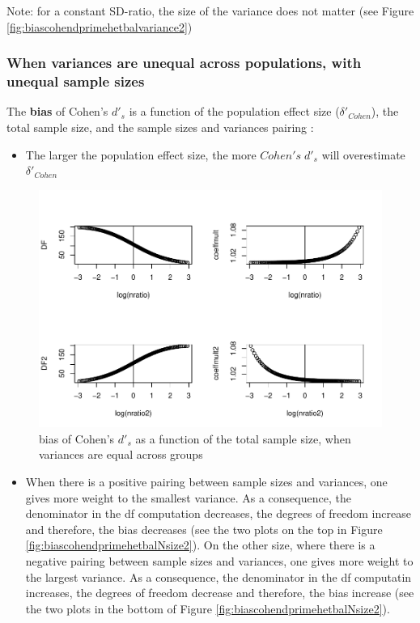 \documentclass[
  man]{apa6}
\providecommand{\tightlist}{%
  \setlength{\itemsep}{0pt}\setlength{\parskip}{0pt}}
\begin{document}
Note: for a constant SD-ratio, the size of the variance does not matter (see Figure \ref{fig:biascohendprimehetbalvariance2})

\hypertarget{when-variances-are-unequal-across-populations-with-unequal-sample-sizes}{%
\subsubsection{When variances are unequal across populations, with unequal sample sizes}\label{when-variances-are-unequal-across-populations-with-unequal-sample-sizes}}

The \textbf{bias} of Cohen's \(d'_s\) is a function of the population effect size (\(\delta'_{Cohen}\)), the total sample size, and the sample sizes and variances pairing :

\begin{itemize}
\tightlist
\item
  The larger the population effect size, the more \(Cohen's \; d'_s\) will overestimate \(\delta'_{Cohen}\)
\end{itemize}

\begin{figure}
\centering
\includegraphics{Theoretical-Bias-and-variance,-as-a-function-of-population-parameters_files/figure-latex/biascohendprimehetunbalNratio2-1.pdf}
\caption{\label{fig:biascohendprimehetunbalNratio2}bias of Cohen's \(d'_s\) as a function of the total sample size, when variances are equal across groups}
\end{figure}

\begin{itemize}
\tightlist
\item
  When there is a positive pairing between sample sizes and variances, one gives more weight to the smallest variance. As a consequence, the denominator in the df computation decreases, the degrees of freedom increase and therefore, the bias decreases (see the two plots on the top in Figure \ref{fig:biascohendprimehetbalNsize2}). On the other size, where there is a negative pairing between sample sizes and variances, one gives more weight to the largest variance. As a consequence, the denominator in the df computatin increases, the degrees of freedom decrease and therefore, the bias increase (see the two plots in the bottom of Figure \ref{fig:biascohendprimehetbalNsize2}).
\end{itemize}
\end{document}
